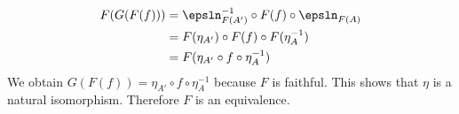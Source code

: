 \begin{answer}
\begin{itemize}
\[\begin{tikzcd}
                \end{tikzcd}
            \]
            \begin{align*}
                F(G(F(f))) & = \epsln_{F(A')}^{-1} \circ F(f) \circ \epsln_{F(A)}\\
                           & = F(\eta_{A'}) \circ F(f) \circ F(\eta_A^{-1})\\
                           & = F(\eta_{A'} \circ f \circ \eta_A^{-1})
            \end{align*}
            We obtain $G(F(f)) = \eta_{A'} \circ f \circ \eta_A^{-1}$ because $F$ is faithful.
            This shows that $\eta$ is a natural isomorphism.
            Therefore $F$ is an equivalence.
    \end{itemize}
\end{answer}

